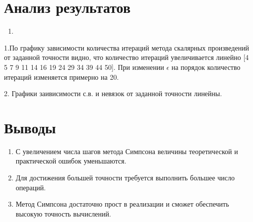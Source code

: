 \documentclass{article}
\begin{document}
	
	\section{Анализ результатов}
	\begin{enumerate}
		\item 
	\end{enumerate}
	1.По графику зависимости количества итераций метода скалярных произведений от заданной точности видно, что количество итераций увеличивается линейно [4 5 7 9 11 14 16 19 24 29 34 39 44 50].
	При изменении $\epsilon$ на порядок количество итераций изменяется примерно на 20. 
	
	2. Графики заивисимости с.в. и невязок от заданной точности линейны.
	
	
	\section{Выводы}
	\begin{enumerate}
		\item С увеличением числа шагов метода Симпсона величины теоретической и практической ошибок уменьшаются.
		\item Для достижения большей точности требуется выполнить большее число операций.
		\item Метод Симпсона достаточно прост в реализации и сможет обеспечить высокую точность вычислений.
	\end{enumerate}
\end{document}
